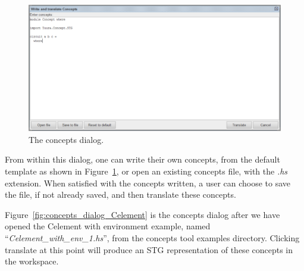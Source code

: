 \documentclass[british,conference,compsoc]{IEEEtran}
\begin{document}
\begin{figure}[H]
\begin{centering}
\includegraphics[scale=0.4]{Images/concepts_dialog_screenshot.pdf}
\par\end{centering}

\begin{centering}
\protect\caption{\label{fig:concepts_dialog_screenshot}The concepts dialog.}

\par\end{centering}

\end{figure}

From within this dialog, one can write their own concepts, from the default template as shown in Figure~\ref{fig:concepts_dialog_screenshot}, or open an existing concepts file, with the  
\emph{.hs} extension. When satisfied with the concepts written, a user can choose to save the file, if not already saved, and then translate these concepts.

%
%
%

Figure~\ref{fig:concepts_dialog_Celement} is the concepts dialog after we have opened the Celement with environment example, named ``\emph{Celement\_with\_env\_1.hs}'', from the 
concepts tool examples directory. Clicking translate at this point will produce an STG representation of these concepts in the workspace. 
\end{document}
